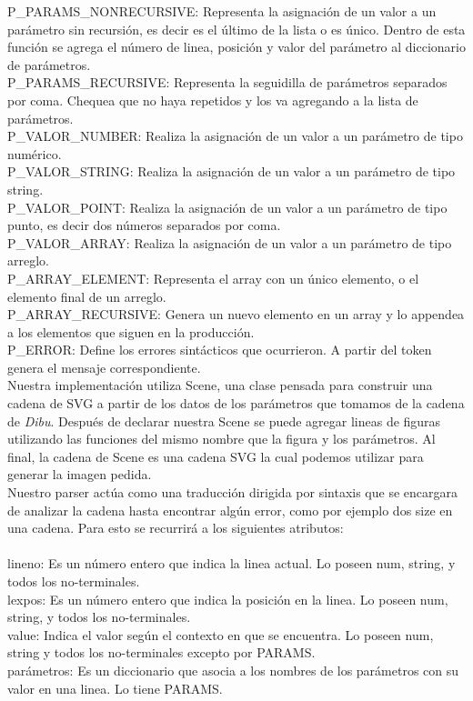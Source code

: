 P_PARAMS_NONRECURSIVE: Representa la asignación de un valor a un parámetro sin recursión, es decir es el último de la lista o es único. Dentro de esta función se agrega
el número de linea, posición y valor del parámetro al diccionario de parámetros.\\

P_PARAMS_RECURSIVE: Representa la seguidilla de parámetros separados por coma. Chequea que no haya repetidos y los va agregando a la lista de parámetros.\\

P_VALOR_NUMBER: Realiza la asignación de un valor a un parámetro de tipo numérico.\\

P_VALOR_STRING: Realiza la asignación de un valor a un parámetro de tipo string.\\

P_VALOR_POINT: Realiza la asignación de un valor a un parámetro de tipo punto, es decir dos números separados por coma.\\

P_VALOR_ARRAY: Realiza la asignación de un valor a un parámetro de tipo arreglo.\\

P_ARRAY_ELEMENT: Representa el array con un único elemento, o el elemento final de un arreglo.\\

P_ARRAY_RECURSIVE: Genera un nuevo elemento en un array y lo appendea a los elementos que siguen en la producción.\\

P_ERROR: Define los errores sintácticos que ocurrieron. A partir del token genera el mensaje correspondiente.\\

Nuestra implementación utiliza Scene, una clase pensada para construir una cadena de SVG a partir de los datos de los
parámetros que tomamos de la cadena de \textit{Dibu}. Después de declarar nuestra Scene se puede agregar lineas de
figuras utilizando las funciones del mismo nombre que la figura y los parámetros. Al final, la cadena de Scene es una
cadena SVG la cual podemos utilizar para generar la imagen pedida.\\

Nuestro parser actúa como una traducción dirigida por sintaxis que se encargara de analizar la cadena hasta encontrar
algún error, como por ejemplo dos size en una cadena. Para esto se recurrirá a los siguientes atributos:\\
\\
lineno: Es un número entero que indica la linea actual. Lo poseen num, string, y todos los no-terminales.\\
lexpos: Es un número entero que indica la posición en la linea. Lo poseen num, string, y todos los no-terminales.\\
value: Indica el valor según el contexto en que se encuentra. Lo poseen num, string y todos los no-terminales excepto
por PARAMS.\\
parámetros: Es un diccionario que asocia a los nombres de los parámetros con su valor en una linea. Lo tiene PARAMS.\\

